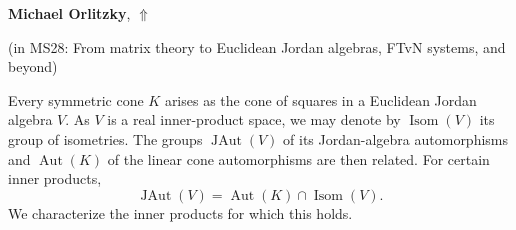 \documentclass[ILAS2025-program.tex]{subfiles}
\begin{document}
\hypertarget{down0385}{}\begin{ilasabstract}
    
\textbf{Michael Orlitzky},  \hfill \hyperlink{up0385}{$\Uparrow$}
    
    
(in {\color{mstitle}MS28: From matrix theory to Euclidean Jordan algebras, FTvN systems, and beyond})
        
\mtskip
    Every symmetric cone $K$ arises as the cone of squares in a Euclidean
Jordan algebra $V$. As $V$ is a real inner-product space, we may
denote by $\operatorname{Isom}\left(V\right)$ its group of
isometries. The groups $\operatorname{JAut}\left(V\right)$ of its
Jordan-algebra automorphisms and $\operatorname{Aut}\left(K\right)$
of the linear cone automorphisms are then related. For certain inner
products,
%
\begin{equation*}
  \operatorname{JAut}\left(V\right)
  =
  \operatorname{Aut}\left(K\right)
  \cap
  \operatorname{Isom}\left(V\right).
\end{equation*}
%
We characterize the inner products for which this holds.

\end{ilasabstract}
    
\end{document}
